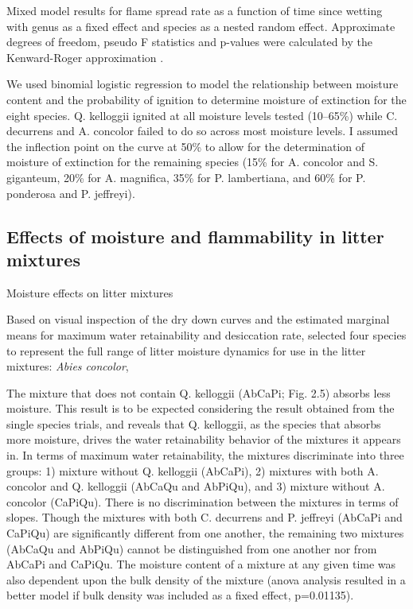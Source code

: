 \documentclass[fire,article,submit,moreauthors,pdftex]{Definitions/mdpi}
\begin{document}
\begin{table}[H]
  \caption[Mixed linear model of flame spread rate.]{Mixed model results for flame spread rate  as a function of time since wetting with genus as a fixed effect and species as a nested random effect. Approximate degrees of freedom, pseudo F statistics and p-values were calculated by the Kenward-Roger approximation \cite{Kenward_Roger-1997}.}
  \label{tab:spreadrate-anova}
\centering

\end{table}



We used binomial logistic regression to model the relationship between moisture content and the probability of ignition to determine moisture of extinction for the eight species. Q. kelloggii ignited at all moisture levels tested (10--65\%) while C. decurrens and A. concolor failed to do so across most moisture levels. I assumed the inflection point on the curve at 50\% to allow for the determination of moisture of extinction for the remaining species (15\% for A. concolor and S. giganteum, 20\% for A. magnifica, 35\% for P. lambertiana, and 60\% for P. ponderosa and P. jeffreyi).

\subsection{Effects of moisture and flammability in litter mixtures}

Moisture effects on litter mixtures

Based on visual inspection of the dry down curves and the estimated marginal means for maximum water retainability and desiccation rate, selected four species to represent the full range of litter moisture dynamics for use in the litter mixtures: \emph{Abies concolor}, \

The mixture that does not contain Q. kelloggii (AbCaPi; Fig. 2.5) absorbs less moisture. This result is to be expected considering the result obtained from the single species trials, and reveals that Q. kelloggii, as the species that absorbs more moisture, drives the water retainability behavior of the mixtures it appears in. In terms of maximum water retainability, the mixtures discriminate into three groups: 1) mixture without Q. kelloggii (AbCaPi), 2) mixtures with both A. concolor and Q. kelloggii (AbCaQu and AbPiQu), and 3) mixture without A. concolor (CaPiQu). There is no discrimination between the mixtures in terms of slopes. Though the mixtures with both C. decurrens and P. jeffreyi (AbCaPi and CaPiQu) are significantly different from one another, the remaining two mixtures (AbCaQu and AbPiQu) cannot be distinguished from one another nor from AbCaPi and CaPiQu. The moisture content of a mixture at any given time was also dependent upon the bulk density of the mixture (anova analysis resulted in a better model if bulk density was included as a fixed effect, p=0.01135).
\end{document}
